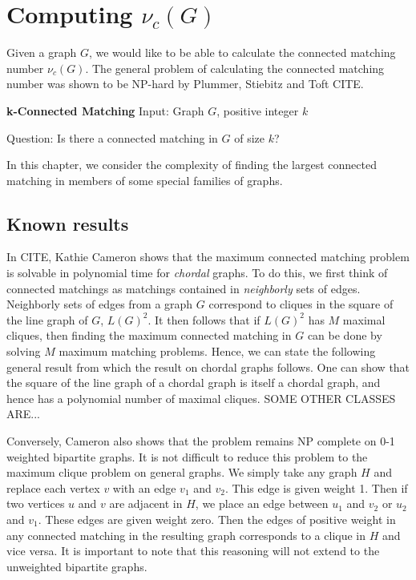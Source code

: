 \chapter{Computing $\nu_c(G)$}

Given a graph $G$, we would like to be able to calculate the connected matching number $\nu _c(G)$.  
%
The general problem of calculating the connected matching number was shown to be NP-hard by Plummer, Stiebitz and Toft CITE.  
%
\begin{framed}
	\noindent\textbf{k-Connected Matching}
	\vskip 0.5cm
	\noindent Input: Graph $G$, positive integer $k$
	
	\noindent Question: Is there a connected matching in $G$ of size $k$?
\end{framed}
In this chapter, we consider the complexity of finding the largest connected matching in members of some special families of graphs.

\section{Known results}

In CITE, Kathie Cameron shows that the maximum connected matching problem is solvable in polynomial time for {\it chordal} graphs.   
%
To do this, we first think of connected matchings as matchings contained in {\it neighborly} sets of edges.  
%
Neighborly sets of edges from a graph $G$ correspond to cliques in the square of the line graph of $G$, $L(G)^2$.  
%
It then follows that if $L(G)^2$ has $M$ maximal cliques, then finding the maximum connected matching in $G$ can be done by solving $M$ maximum matching problems.  
%
Hence, we can state the following general result from which the result on chordal graphs follows.
%
%
One can show that the square of the line graph of a chordal graph is itself a chordal graph, and hence has a polynomial number of maximal cliques. SOME OTHER CLASSES ARE...
%

Conversely, Cameron also shows that the problem remains NP complete on 0-1 weighted bipartite graphs.  
%
It is not difficult to reduce this problem to the maximum clique problem on general graphs.  
%
We simply take any graph $H$ and replace each vertex $v$ with an edge $v_1$ and $v_2$.  This edge is given weight 1.  
%
Then if two vertices $u$ and $v$ are adjacent in $H$, we place an edge between $u_1$ and $v_2$ or $u_2$ and $v_1$.
%
These edges are given weight zero.
%  
Then the edges of positive weight in any connected matching in the resulting graph corresponds to a clique in $H$ and vice versa.
%
It is important to note that this reasoning will not extend to the unweighted bipartite graphs.  


